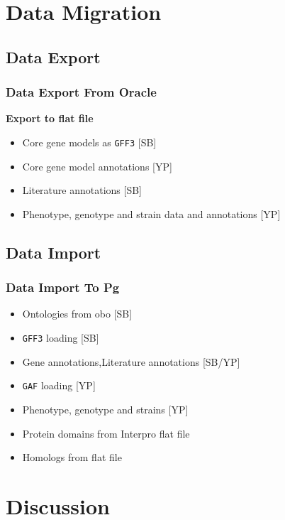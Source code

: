 \documentclass[hyperref={pdfpagelabels=false}, compress]{beamer}
\begin{document}
\section{Data Migration}

\subsection{Data Export}
\begin{frame}
    \frametitle{Data Export From Oracle} 
	\textbf{\Large Export to flat file}
	\begin{itemize}
		\item Core gene models as \texttt{GFF3} [SB]
		\item Core gene model annotations [YP]
		\item Literature annotations [SB]
		\item Phenotype, genotype and strain data and annotations [YP]
	\end{itemize}
        
\end{frame}

\subsection{Data Import}
\begin{frame}
  	\frametitle{Data Import To Pg}
  	\begin{itemize}
		\item Ontologies from obo [SB]
       	\item \texttt{GFF3} loading [SB]
       	\item Gene annotations,Literature annotations [SB/YP]
       	\item \texttt{GAF} loading [YP]
       	\item Phenotype, genotype and strains [YP]
       	\item {\color{dark-gray} Protein domains from Interpro flat file}
       	\item {\color{dark-gray} Homologs from flat file}
  	\end{itemize}
  	

	
\end{frame}

\section{Discussion}
\end{document}
